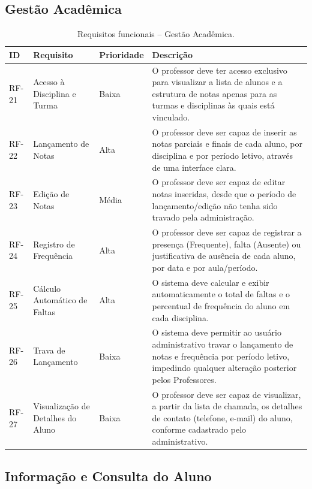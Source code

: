 \subsection{Gestão Acadêmica}

\begin{table}[H]
\centering
\caption{Requisitos funcionais -- Gestão Acadêmica.}
\begin{tabularx}{\textwidth}{p{} p{} p{} X}
\toprule
\textbf{ID} & \textbf{Requisito} & \textbf{Prioridade} & \textbf{Descrição} \\
\midrule
RF-21 & Acesso à Disciplina e Turma & Baixa & O professor deve ter acesso exclusivo para visualizar a lista de alunos e a estrutura de notas apenas para as turmas e disciplinas às quais está vinculado. \\
RF-22 & Lançamento de Notas & Alta & O professor deve ser capaz de inserir as notas parciais e finais de cada aluno, por disciplina e por período letivo, através de uma interface clara. \\
RF-23 & Edição de Notas & Média & O professor deve ser capaz de editar notas inseridas, desde que o período de lançamento/edição não tenha sido travado pela administração. \\
RF-24 & Registro de Frequência & Alta & O professor deve ser capaz de registrar a presença (Frequente), falta (Ausente) ou justificativa de ausência de cada aluno, por data e por aula/período. \\
RF-25 & Cálculo Automático de Faltas & Alta & O sistema deve calcular e exibir automaticamente o total de faltas e o percentual de frequência do aluno em cada disciplina. \\
RF-26 & Trava de Lançamento & Baixa & O sistema deve permitir ao usuário administrativo travar o lançamento de notas e frequência por período letivo, impedindo qualquer alteração posterior pelos Professores. \\
RF-27 & Visualização de Detalhes do Aluno & Baixa & O professor deve ser capaz de visualizar, a partir da lista de chamada, os detalhes de contato (telefone, e-mail) do aluno, conforme cadastrado pelo administrativo. \\
\bottomrule
\end{tabularx}
\end{table}

\subsection{Informação e Consulta do Aluno}

